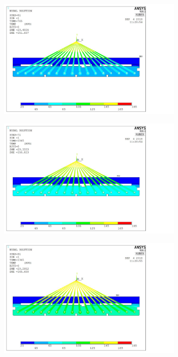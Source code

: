 \documentclass[a4paper,12pt]{report}
\begin{document}
\begin{figure}[hbtp]
\begin{subfigure}[b]{0.25\textwidth}
	\end{subfigure}
	\qquad
	\begin{subfigure}[b]{0.25\textwidth}
		\centering
		\includegraphics[scale=0.12]{Figures/animation/Figure_7.pdf}
	\end{subfigure}
	\qquad
	\begin{subfigure}[b]{0.25\textwidth}
		\centering
		\includegraphics[scale=0.12]{Figures/animation/Figure_9.pdf}
	\end{subfigure}
	\qquad
	\begin{subfigure}[b]{0.25\textwidth}
		\centering
		\includegraphics[scale=0.12]{Figures/animation/Figure_11.pdf}

\end{subfigure}
\end{figure}
\end{document}
